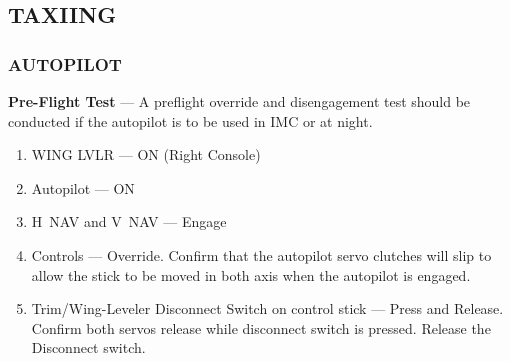 \subsection{TAXIING}
\subsubsection{AUTOPILOT}
\textbf{Pre-Flight Test} --- A preflight override and disengagement test should be conducted if the autopilot is to be used in IMC or at night. 

\begin{enumerate}
  \item WING LVLR --- ON (Right Console)
  \item Autopilot --- ON
  \item H~NAV and V~NAV --- Engage
  \item Controls --- Override. Confirm that the autopilot servo clutches will slip to allow the stick to be moved in both axis when the autopilot is engaged.
  \item Trim/Wing-Leveler Disconnect Switch on control stick --- Press and Release. Confirm both servos release while disconnect switch is pressed. Release the Disconnect switch.
  \end{enumerate}

